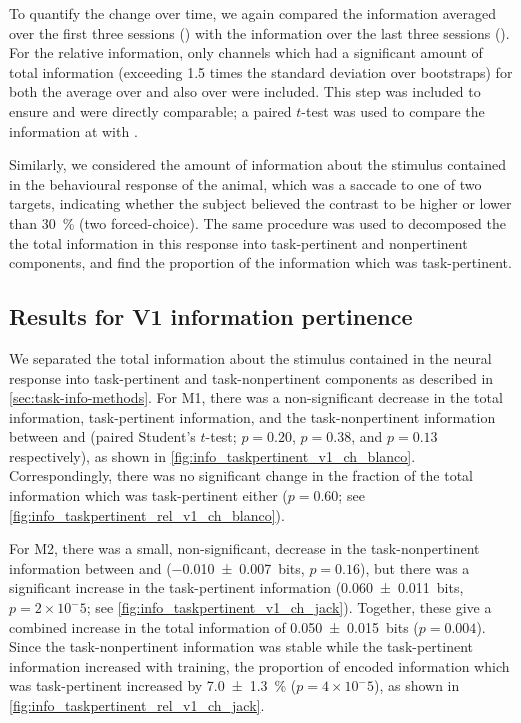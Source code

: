 To quantify the change over time, we again compared the information averaged over the first three sessions () with the information over the last three sessions ().
For the relative information, only channels which had a significant amount of total information (exceeding \num{1.5} times the standard deviation over bootstraps) for both the average over  and also over were included.
This step was included to ensure  and  were directly comparable; a paired $t$-test was used to compare the information at  with .

Similarly, we considered the amount of information about the stimulus contained in the behavioural response of the animal, which was a saccade to one of two targets, indicating whether the subject believed the contrast to be higher or lower than \SI{30}{\percent} (two forced-choice).
The same procedure was used to decomposed the the total information in this response into task-pertinent and nonpertinent components, and find the proportion of the information which was task-pertinent.


\subsection{Results for \acs{V1} information pertinence}

We separated the total information about the stimulus contained in the neural response into task-pertinent and task-nonpertinent components as described in \autoref{sec:task-info-methods}.
For \ac{M1}, there was a non-significant decrease in the total information, task-pertinent information, and the task-nonpertinent information between  and  (paired Student's $t$-test; $p=0.20$, $p=0.38$, and $p=0.13$ respectively), as shown in \autoref{fig:info_taskpertinent_v1_ch_blanco}.
Correspondingly, there was no significant change in the fraction of the total information which was task-pertinent either ($p=0.60$; see \autoref{fig:info_taskpertinent_rel_v1_ch_blanco}).

For \ac{M2}, there was a small, non-significant, decrease in the task-nonpertinent information between  and  (\SI{-0.010\pm0.007}{bits}, $p=0.16$), but there was a significant increase in the task-pertinent information (\SI{+0.060\pm0.011}{bits}, $p = 2 \times 10^-5$; see \autoref{fig:info_taskpertinent_v1_ch_jack}).
Together, these give a combined increase in the total information of \SI{+0.050\pm0.015}{bits} ($p=0.004$).
Since the task-nonpertinent information was stable while the task-pertinent information increased with training, the proportion of encoded information which was task-pertinent increased by \SI{+7.0\pm1.3}{\percent} ($p = 4 \times 10^-5$), as shown in \autoref{fig:info_taskpertinent_rel_v1_ch_jack}.

